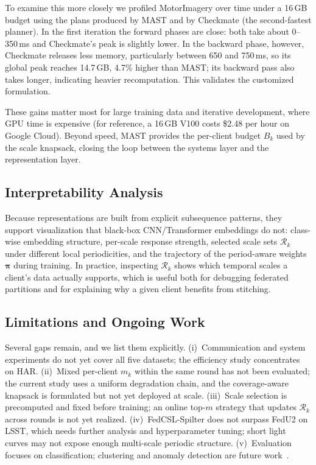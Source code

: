 \documentclass[sigconf]{acmart}
\begin{document}
To examine this more closely we profiled MotorImagery over time under a 16\,GB
budget using the plans produced by MAST and by Checkmate (the second-fastest
planner). In the first iteration the forward phases are close: both take about
0--350\,ms and Checkmate's peak is slightly lower. In the backward phase,
however, Checkmate releases less memory, particularly between 650 and 750\,ms,
so its global peak reaches 14.7\,GB, 4.7\% higher than MAST; its backward pass
also takes longer, indicating heavier recomputation. This validates the
customized formulation.

These gains matter most for large training data and iterative development, where
GPU time is expensive (for reference, a 16\,GB V100 costs \$2.48 per hour on
Google Cloud). Beyond speed, MAST provides the per-client budget $B_k$ used by
the scale knapsack, closing the loop between the systems layer and the
representation layer.

\subsection{Interpretability Analysis}

Because representations are built from explicit subsequence patterns, they
support visualization that black-box CNN/Transformer embeddings do not: class-wise
embedding structure, per-scale response strength, selected scale sets
$\mathcal{R}_k$ under different local periodicities, and the trajectory of the
period-aware weights $\boldsymbol{\pi}$ during training. In practice, inspecting
$\mathcal{R}_k$ shows which temporal scales a client's data actually supports,
which is useful both for debugging federated partitions and for explaining why a
given client benefits from stitching.

\subsection{Limitations and Ongoing Work}
\label{sec:limitations}

Several gaps remain, and we list them explicitly.
(i)~Communication and system experiments do not yet cover all five datasets; the
efficiency study concentrates on HAR.
(ii)~Mixed per-client $m_k$ within the same round has not been evaluated; the
current study uses a uniform degradation chain, and the coverage-aware knapsack
is formulated but not yet deployed at scale.
(iii)~Scale selection is precomputed and fixed before training; an online
top-$m$ strategy that updates $\mathcal{R}_k$ across rounds is not yet realized.
(iv)~FedCSL-Spilter does not surpass FedU2 on LSST, which needs further analysis
and hyperparameter tuning; short light curves may not expose enough multi-scale
periodic structure.
(v)~Evaluation focuses on classification; clustering and anomaly detection are
future work~\cite{ts2vec,timescsl}.
\end{document}
